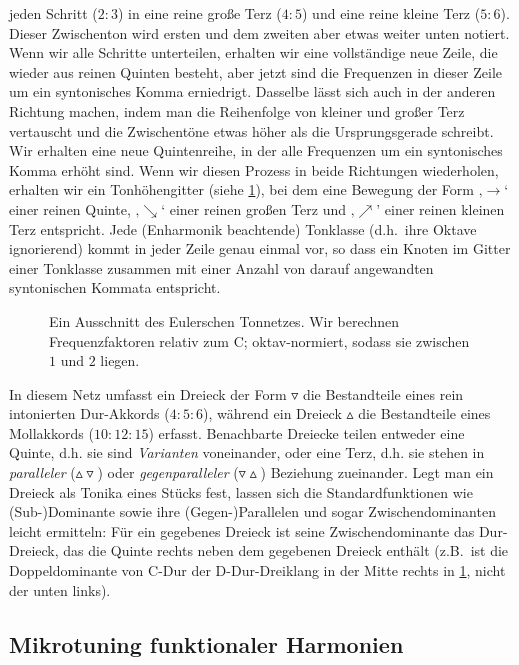 \documentclass[ngerman,11pt]{scrartcl}
\begin{document}
jeden Schritt ($2:3$) in eine reine große Terz ($4:5$) und eine reine kleine
Terz ($5:6$). Dieser Zwischenton wird ersten und dem zweiten aber etwas weiter
unten notiert. Wenn wir alle Schritte unterteilen, erhalten wir eine
vollständige neue Zeile, die wieder aus reinen Quinten besteht, aber jetzt sind
die Frequenzen in dieser Zeile um ein syntonisches Komma erniedrigt. Dasselbe
lässt sich auch in der anderen Richtung machen, indem man die Reihenfolge von
kleiner und großer Terz vertauscht und die Zwischentöne etwas höher als die
Ursprungsgerade schreibt. Wir erhalten eine neue Quintenreihe, in der alle
Frequenzen um ein syntonisches Komma erhöht sind. Wenn wir diesen Prozess in
beide Richtungen wiederholen, erhalten wir ein Tonhöhengitter (siehe
\cref{fig:latticeExcerpt}), bei dem eine Bewegung der Form ‚$\to$‘ einer reinen
Quinte, ‚$\searrow$‘ einer reinen großen Terz und ‚$\nearrow$’ einer reinen
kleinen Terz entspricht. Jede (Enharmonik beachtende) Tonklasse (d.h.\ ihre
Oktave ignorierend) kommt in jeder Zeile genau einmal vor, so dass ein Knoten im
Gitter einer Tonklasse zusammen mit einer Anzahl von darauf angewandten
syntonischen Kommata entspricht.

\begin{figure}[h]
  
  \caption{Ein Ausschnitt des Eulerschen Tonnetzes. Wir berechnen
  	Frequenzfaktoren relativ zum C; oktav-normiert, sodass sie zwischen $1$
  	und $2$ liegen.}\label{fig:latticeExcerpt}
\end{figure}

In diesem Netz umfasst ein Dreieck der Form $\triangledown$ die Bestandteile 
eines rein intonierten Dur-Akkords ($4:5:6$), während ein Dreieck $\vartriangle$
die Bestandteile eines Mollakkords ($10:12:15$) erfasst. Benachbarte Dreiecke
teilen entweder eine Quinte, d.h. sie sind \emph{Varianten} voneinander, oder
eine Terz, d.h. sie stehen in \emph{paralleler}
($\vartriangle\!\!\!\triangledown$) oder \emph{gegenparalleler}
($\triangledown\!\!\!\vartriangle$) Beziehung zueinander. Legt man ein Dreieck
als Tonika eines Stücks fest, lassen sich die Standardfunktionen wie
(Sub-)Dominante sowie ihre (Gegen-)Parallelen und sogar Zwischendominanten
leicht ermitteln: Für ein gegebenes Dreieck ist seine Zwischendominante das
Dur-Dreieck, das die Quinte rechts neben dem gegebenen Dreieck enthält (z.B.\
ist die Doppeldominante von C-Dur der D-Dur-Dreiklang in der Mitte rechts in
\cref{fig:latticeExcerpt}, nicht der unten links).

\subsection{Mikrotuning funktionaler Harmonien}
\end{document}
